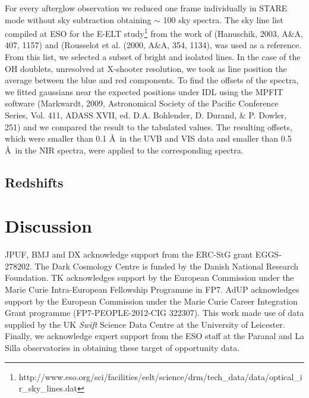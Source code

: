 \documentclass[iop, twocolappendix, numberedappendix, tighten, appendixfloats]{emulateapj}
\begin{document}
	
	For every afterglow observation we reduced one frame individually in STARE mode without
	sky subtraction obtaining $\sim$ 100 sky spectra. The sky line list compiled at ESO for
	the E-ELT
	study\footnote{http://www.eso.org/sci/facilities/eelt/science/drm/tech\_data/data/optical\_ir\_sky\_lines.dat}
	from the work of (Hanuschik, 2003, A\&A, 407, 1157) and (Rousselot et al. (2000, A\&A, 354, 1134), was used as a reference.
	From this list, we selected a subset of bright and isolated lines. In the case of the OH doublets, unresolved at X-shooter resolution, we took as line position the average between the blue and red components. To find the offsets of the spectra, we fitted gaussians near the
	expected positions under IDL using the MPFIT software (Markwardt, 2009, Astronomical Society of the Pacific Conference Series, Vol. 411, ADASS XVII, ed. D.A. Bohlender, D. Durand, \& P. Dowler, 251) and we compared the result to the tabulated values.
	The resulting offsets, which were smaller than 0.1 \AA~in the UVB and VIS data
	and smaller than 0.5 \AA~in the NIR spectra, were applied to the corresponding spectra.
	
	\subsection{Redshifts}
	
	\section{Discussion}
	
	\begin{acknowledgements}
		JPUF, BMJ and DX acknowledge support from the ERC-StG grant EGGS-278202.  The
		Dark Cosmology Centre is funded by the Danish National Research Foundation.  TK
		acknowledges support by the European Commission under the Marie Curie
		Intra-European Fellowship Programme in FP7.  AdUP acknowledges support by the
		European Commission under the Marie Curie Career Integration Grant programme
		(FP7-PEOPLE-2012-CIG 322307).  This work made use of data supplied by the UK
		{\it Swift} Science Data Centre at the University of Leicester.  Finally, we
		acknowledge expert support from the ESO staff at the Paranal and La Silla
		observatories in obtaining these target of opportunity data.
		
	\end{acknowledgements}
	
\end{document}

